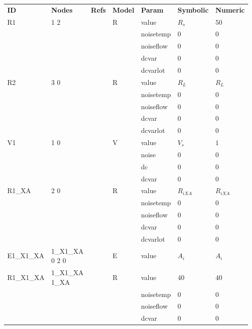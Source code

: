 \begin{table}[h]
\centering
\begin{tabular}[c]{lllllll}
\textbf{ID} & \textbf{Nodes} & \textbf{Refs} & \textbf{Model} & \textbf{Param} & \textbf{Symbolic} & \textbf{Numeric} \\ 
\rowcolor{myyellow}
\small{R1} &\small{1 2 } & &\small{R} &\small{value} &$R_{s}$ &$50$ \\ 
 & & & &\small{noisetemp} &$0$ &$0$ \\ 
\rowcolor{myyellow}
 & & & &\small{noiseflow} &$0$ &$0$ \\ 
 & & & &\small{dcvar} &$0$ &$0$ \\ 
\rowcolor{myyellow}
 & & & &\small{dcvarlot} &$0$ &$0$ \\ 
\small{R2} &\small{3 0 } & &\small{R} &\small{value} &$R_{L}$ &$R_{L}$ \\ 
\rowcolor{myyellow}
 & & & &\small{noisetemp} &$0$ &$0$ \\ 
 & & & &\small{noiseflow} &$0$ &$0$ \\ 
\rowcolor{myyellow}
 & & & &\small{dcvar} &$0$ &$0$ \\ 
 & & & &\small{dcvarlot} &$0$ &$0$ \\ 
\rowcolor{myyellow}
\small{V1} &\small{1 0 } & &\small{V} &\small{value} &$V_{s}$ &$1$ \\ 
 & & & &\small{noise} &$0$ &$0$ \\ 
\rowcolor{myyellow}
 & & & &\small{dc} &$0$ &$0$ \\ 
 & & & &\small{dcvar} &$0$ &$0$ \\ 
\rowcolor{myyellow}
\small{R1\_XA} &\small{2 0 } & &\small{R} &\small{value} &$R_{i XA}$ &$R_{i XA}$ \\ 
 & & & &\small{noisetemp} &$0$ &$0$ \\ 
\rowcolor{myyellow}
 & & & &\small{noiseflow} &$0$ &$0$ \\ 
 & & & &\small{dcvar} &$0$ &$0$ \\ 
\rowcolor{myyellow}
 & & & &\small{dcvarlot} &$0$ &$0$ \\ 
\small{E1\_X1\_XA} &\small{1\_X1\_XA 0 2 0 } & &\small{E} &\small{value} &$A_{i}$ &$A_{i}$ \\ 
\rowcolor{myyellow}
\small{R1\_X1\_XA} &\small{1\_X1\_XA 1\_XA } & &\small{R} &\small{value} &$40$ &$40$ \\ 
 & & & &\small{noisetemp} &$0$ &$0$ \\ 
\rowcolor{myyellow}
 & & & &\small{noiseflow} &$0$ &$0$ \\ 
 & & & &\small{dcvar} &$0$ &$0$ \\ 

\end{tabular}
\end{table}
